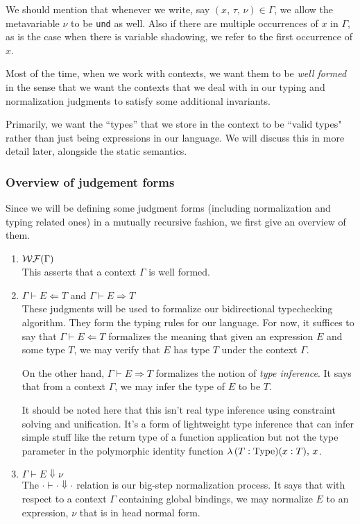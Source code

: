 \documentclass{article}
\begin{document}
We should mention that whenever we write, say
$(x, \, \tau, \, \nu) \in \Gamma$, we allow the metavariable $\nu$ to be 
\verb|und| as well. Also if there are multiple occurrences of $x$ in $\Gamma$,
as is the case when there is variable shadowing, we refer to the first occurrence
of $x$.

Most of the time, when we work with contexts, we want them to be \textit{well
formed} in the sense that we want the contexts that we deal with in our typing
and normalization judgments to satisfy some additional invariants.

Primarily, we want the ``types'' that we store in the context to be ``valid types"
rather than just being expressions in our language.
We will discuss this in more detail later, alongside the static semantics.

\subsubsection{Overview of judgement forms}
Since we will be defining some judgment forms (including normalization and
typing related ones) in a mutually recursive fashion, we first give an
overview of them.

\begin{enumerate}
\item $\operatorname{\mathcal{WF}}(\Gamma)$ \\
  This asserts that a context $\Gamma$ is well formed.

\item $\Gamma \vdash E \Leftarrow T$ and $\Gamma \vdash E \Rightarrow T$ \\
  These judgments will be used to formalize our bidirectional typechecking
  algorithm. They form the typing rules for our language.
  For now, it suffices to say that $\Gamma \vdash E \Leftarrow T$ formalizes the
  meaning that given an expression $E$ and some type $T$, we may verify that
  $E$ has type $T$ under the context $\Gamma$.

  On the other hand, $\Gamma \vdash E \Rightarrow T$ formalizes the notion of
  \textit{type inference}. It says that from a context $\Gamma$, we may infer
  the type of $E$ to be $T$. 
  
  It should be noted here that this isn't real type
  inference using constraint solving and unification. It's a form of lightweight
  type inference that can infer simple stuff like the return type of a function
  application but not the type parameter in the polymorphic identity function
  $\lambda \, (T : \operatorname{Type}) (x : T), \, x$.

\item $\Gamma \vdash E \Downarrow \nu$ \\
  The $\cdot \vdash \cdot \Downarrow \cdot$ relation is our big-step normalization
  process.
  It says that with respect to a context $\Gamma$ containing global bindings, we
  may normalize $E$ to an expression, $\nu$ that is in head normal form.
\end{enumerate}
\end{document}

